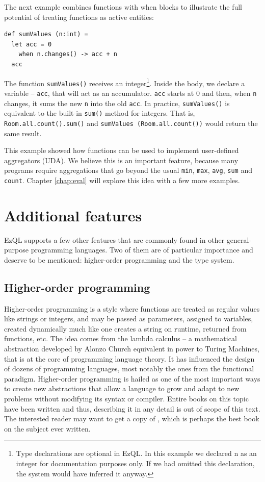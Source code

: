 The next example combines functions with when blocks to illustrate the
full potential of treating functions as active entities:

\begin{lstlisting}
def sumValues (n:int) =
  let acc = 0
    when n.changes() -> acc + n
  acc
\end{lstlisting}

The function \verb=sumValues()= receives an integer\footnote{Type
  declarations are optional in EzQL. In this example we declared n as
  an integer for documentation purposes only. If we had omitted this
  declaration, the system would have inferred it anyway.}. Inside the
body, we declare a variable -- \verb=acc=, that will act as an
accumulator. \verb=acc= starts at 0 and then, when \verb=n= changes,
it sums the new \verb=n= into the old \verb=acc=. In practice,
\verb=sumValues()= is equivalent to the built-in \verb=sum()= method
for integers. That is, \verb=Room.all.count().sum()= and
\verb=sumValues (Room.all.count())= would return the same result.

This example showed how functions can be used to implement
user-defined aggregators (UDA). We believe this is an important
feature, because many programs require aggregations that go beyond the
usual \verb=min=, \verb=max=, \verb=avg=, \verb=sum= and
\verb=count=. Chapter \ref{chap:eval} will explore this idea with a
few more examples.

\section{Additional features}

EzQL supports a few other features that are commonly found in other
general-purpose programming languages. Two of them are of particular
importance and deserve to be mentioned: higher-order programming and
the type system.

\subsection{Higher-order programming}
\label{sec:higherorder-programming}

Higher-order programming is a style where functions are treated as
regular values like strings or integers, and may be passed as
parameters, assigned to variables, created dynamically much like one
creates a string on runtime, returned from functions, etc. The idea
comes from the lambda calculus \cite{tapl} -- a mathematical
abstraction developed by Alonzo Church equivalent in power to Turing
Machines, that is at the core of programming language theory. It has
influenced the design of dozens of programming languages, most notably
the ones from the functional paradigm. Higher-order programming is
hailed as one of the most important ways to create new abstractions
that allow a language to grow and adapt to new problems without
modifying its syntax or compiler. Entire books on this topic have been
written and thus, describing it in any detail is out of scope of this
text. The interested reader may want to get a copy of \cite{sicp},
which is perhaps the best book on the subject ever written.

